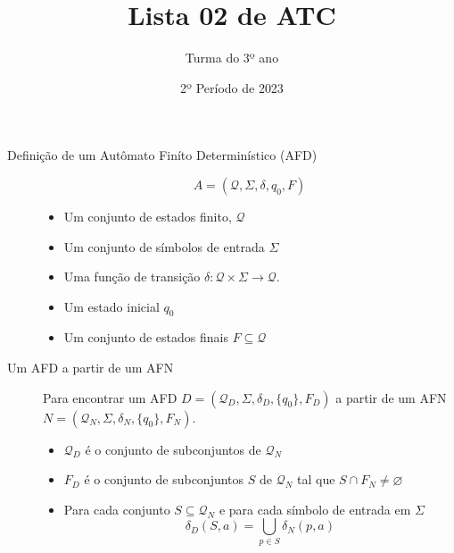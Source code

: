 \documentclass[12pt]{article}
\title{Lista 02 de ATC}
\date{2º Período de 2023}
\author{Turma do 3º ano}
\def\cQ{\mathcal{Q}}
\def\emptyset{\varnothing}
\begin{document}
 

\maketitle

\begin{description}

\item[Definição de um Autômato Finíto Determinístico (AFD)]
\[A = (\cQ, \Sigma, \delta, q_0, F)\]
\begin{itemize}
\item Um conjunto de estados finito, $\cQ$
\item Um conjunto de símbolos de entrada $\Sigma$
\item Uma função de transição $\delta: \cQ\times\Sigma\rightarrow\cQ$.
\item Um estado inicial $q_0$
\item Um conjunto de estados finais $F\subseteq \cQ$
\end{itemize}



\item[Um AFD a partir de um AFN]
Para encontrar um AFD $D = (\cQ_D, \Sigma, \delta_D, \{q_0\}, F_D)$ a partir de um AFN $N = (\cQ_N, \Sigma, \delta_N, \{q_0\}, F_N)$.

\begin{itemize}

\item $\cQ_D$ é o conjunto de subconjuntos de $\cQ_N$

\item $F_D$ é o conjunto de subconjuntos $S$ de $\cQ_N$ tal que $S\cap F_N\neq\emptyset$

\item Para cada conjunto $S\subseteq \cQ_N$ e para cada símbolo de entrada em $\Sigma$
\[\delta_D(S,a) = \bigcup_{p\in S} \delta_N(p,a)\]

\end{itemize}


\end{description}

\vspace{3em}






\break
\end{document}
